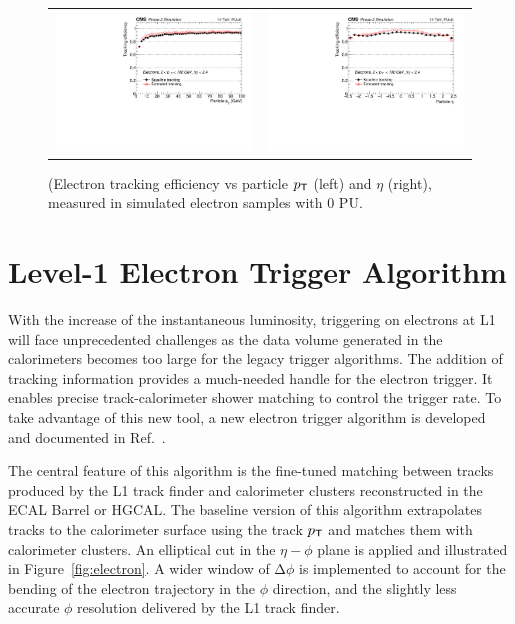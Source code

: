  \begin{figure}[tbh!]
 \begin{center}
 \begin{tabular}{cc}
  \includegraphics[width=.45\linewidth]{figures/Part2/Upgrade/L1TK_elec-pu0_eff_pt}&
  \includegraphics[width=.45\linewidth]{figures/Part2/Upgrade/L1TK_elec-pu0_eff_eta}
 \end{tabular}
 \caption{(Electron tracking efficiency vs particle $p_{\textsf{T}}$ (left) and $\eta$ (right), measured in simulated electron samples with 0 \ac{PU}.}
 \label{fig:electronperformance}
 \end{center}
\end{figure} 

\section{Level-1 Electron Trigger Algorithm}
\label{sec:L1Ele}

With the increase of the instantaneous luminosity, triggering on electrons at \ac{L1} will face unprecedented challenges as the data volume generated in the calorimeters becomes too large for the legacy trigger algorithms. The addition of tracking information provides a much-needed handle for the electron trigger. It enables precise track-calorimeter shower matching to control the trigger rate. To take advantage of this new tool, a new electron trigger algorithm is developed and documented in Ref.~\cite{Zabi:2020gjd}. 

The central feature of this algorithm is the fine-tuned matching between tracks produced by the \ac{L1} track finder and calorimeter clusters reconstructed in the \ac{ECAL} Barrel or \ac{HGCAL}. The baseline version of this algorithm extrapolates tracks to the calorimeter surface using the track $p_{\textsf{T}}$ and matches them with calorimeter clusters. An elliptical cut in the $\eta-\phi$ plane is applied and illustrated in Figure~\ref{fig:electron}. A wider window of $\mathrm{\Delta}\phi$ is implemented to account for the bending of the electron trajectory in the $\phi$ direction, and the slightly less accurate $\phi$ resolution delivered by the \ac{L1} track finder.
  
